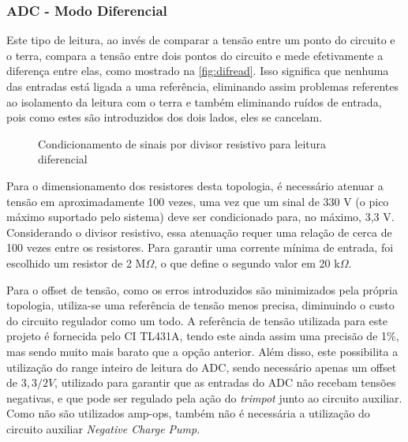 \subsubsection{ADC - Modo Diferencial}\label{modo-diferencial}

Este tipo de leitura, ao invés de comparar a tensão entre um ponto do circuito e o terra, compara a tensão entre dois pontos do circuito e mede efetivamente a diferença entre elas, como mostrado na \autoref{fig:difread}. Isso significa que nenhuma das entradas está ligada a uma referência, eliminando assim problemas referentes ao isolamento da leitura com o terra e também eliminando ruídos de entrada, pois como estes são introduzidos dos dois lados, eles se cancelam.

\begin{figure}[htb!]
    \caption{Condicionamento de sinais por divisor resistivo para leitura diferencial}
    \vspace*{5mm}
    \label{fig:difread}
    \fonte{}
\end{figure}

Para o dimensionamento dos resistores desta topologia, é necessário atenuar a tensão em aproximadamente 100 vezes, uma vez que um sinal de 330 V (o pico máximo suportado pelo sistema) deve ser condicionado para, no máximo, 3,3 V. Considerando o divisor resistivo, essa atenuação requer uma relação de cerca de 100 vezes entre os resistores. Para garantir uma corrente mínima de entrada, foi escolhido um resistor de 2 M$\Omega$, o que define o segundo valor em 20 k$\Omega$.

Para o offset de tensão, como os erros introduzidos são minimizados pela própria topologia, utiliza-se uma referência de tensão menos precisa, diminuindo o custo do circuito regulador como um todo. A referência de tensão utilizada para este projeto é fornecida pelo \gls{CI} TL431A, tendo este ainda assim uma precisão de 1\%, mas sendo muito mais barato que a opção anterior. Além disso, este possibilita a utilização do range inteiro de leitura do \gls{ADC}, sendo necessário apenas um offset de $3,3/2 V$, utilizado para garantir que as entradas do ADC não recebam tensões negativas, e que pode ser regulado pela ação do \textit{trimpot} junto ao circuito auxiliar. Como não são utilizados \gls{amp-op}s, também não é necessária a utilização do circuito auxiliar \textit{Negative Charge Pump}.

